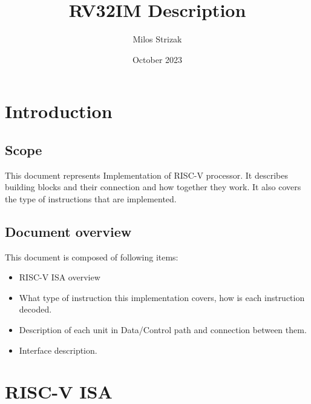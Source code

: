 \documentclass{scrreprt}
\title{RV32IM Description}
\author{Milos Strizak}
\date{October 2023}
\begin{document}
\maketitle
\thispagestyle{empty}
\tableofcontents
\listoffigures
\listoftables


\newpage

\section*{Introduction}
\subsection*{Scope}
This document represents Implementation of RISC-V processor. It describes building blocks and their 
connection and how together they work. It also covers the type of instructions that are implemented.
\subsection*{Document overview}
This document is composed of following items:
\begin{itemize}
    \item RISC-V ISA overview
    \item What type of instruction this implementation covers, how is each instruction decoded.
    \item Description of each unit in Data/Control path and connection between them.
    \item Interface description. 
\end{itemize}

\newpage
\section*{RISC-V ISA}
\end{document}
